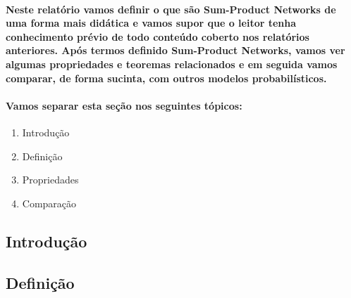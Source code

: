 \documentclass[a4paper,10pt]{article}
\theoremstyle{plain}
\begin{document}
\paragraph{
  Neste relatório vamos definir o que são Sum-Product Networks de uma forma mais didática e vamos
  supor que o leitor tenha conhecimento prévio de todo conteúdo coberto nos relatórios anteriores.
  Após termos definido Sum-Product Networks, vamos ver algumas propriedades e teoremas relacionados
  e em seguida vamos comparar, de forma sucinta, com outros modelos probabilísticos.
}

\paragraph{
  Vamos separar esta seção nos seguintes tópicos:
}

\begin{enumerate}
  \item Introdução
  \item Definição
  \item Propriedades
  \item Comparação
\end{enumerate}

\subsection{Introdução}



\subsection{Definição}

\newpage

\printbibliography
\end{document}
